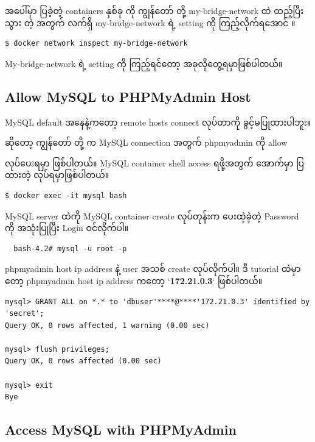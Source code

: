 အပေါ်မှာ ပြခဲ့တဲ့ containers နှစ်ခု ကို ကျွန်တော် တို့ my-bridge-network
ထဲ ထည့်ပြီးသွား တဲ့ အတွက် လက်ရှိ my-bridge-network ရဲ့ setting ကို
ကြည့်လိုက်ရအောင် ။

\begin{verbatim}
$ docker network inspect my-bridge-network
\end{verbatim}

My-bridge-network ရဲ့ setting ကို ကြည့်ရင်တော့ အခုလိုတွေ့ရမှာဖြစ်ပါတယ်။

\hypertarget{allow-mysql-to-phpmyadmin-host}{%
\subsection{Allow MySQL to PHPMyAdmin
Host}\label{allow-mysql-to-phpmyadmin-host}}

MySQL default အနေနဲ့ကတော့ remote hosts connect လုပ်တာကို
ခွင့်မပြုထားပါဘူး။

ဆိုတော့ ကျွန်တော် တို့ က MySQL connection အတွက် phpmyadmin ကို allow

လုပ်ပေးရမှာ ဖြစ်ပါတယ်။ MySQL container shell access ရဖို့အတွက် အောက်မှာ
ပြထားတဲ့ လုပ်ရမှာဖြစ်ပါတယ်။

\begin{verbatim}
$ docker exec -it mysql bash
\end{verbatim}

MySQL server ထဲကို MySQL container create လုပ်တုန်းက ပေးထဲ့ခဲ့တဲ့
Password ကို အသုံးပြုပြီး Login ဝင်လိုက်ပါ။

\begin{verbatim}
  bash-4.2# mysql -u root -p
\end{verbatim}

phpmyadmin host ip address နဲ့ user အသစ် create လုပ်လိုက်ပါ။ ဒီ tutorial
ထဲမှာတော့ phpmyadmin host ip address ကတော့ `\textbf{172.21.0.3}`
ဖြစ်ပါတယ်။

\begin{verbatim}
mysql> GRANT ALL on *.* to 'dbuser'****@****'172.21.0.3' identified by 'secret';
Query OK, 0 rows affected, 1 warning (0.00 sec)

mysql> flush privileges;
Query OK, 0 rows affected (0.00 sec)

mysql> exit
Bye
\end{verbatim}

\hypertarget{access-mysql-with-phpmyadmin}{%
\subsection{Access MySQL with
PHPMyAdmin}\label{access-mysql-with-phpmyadmin}}

